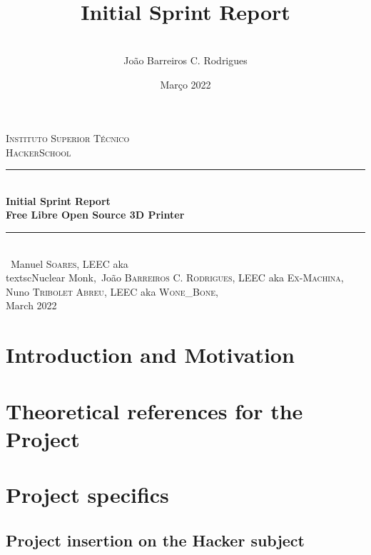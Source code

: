 \documentclass[a4paper,12pt]{article}
\date{Março 2022}
\title{ \\ \large {Initial Sprint Report}}
\author{
\\ João Barreiros C. Rodrigues
\\}
\begin{document}
	\begin{titlepage} %
        \newcommand{\HRule}{\rule{\linewidth}{0.5mm}} %
        \center %
        \textsc{\LARGE Instituto Superior Técnico}\\[1.5cm] %
	\textsc{\Large HackerSchool}\\[0.25cm]
        \HRule\\[0.4cm]
        {\LARGE\bfseries Initial Sprint Report}\\[0.4cm] %
	{\huge\bfseries Free Libre Open Source 3D Printer}\\[0.4cm] %
        \HRule\\[1.5cm]\
	Manuel \textsc{Soares}, LEEC aka \\textsc{Nuclear Monk},\
        João \textsc{Barreiros C. Rodrigues}, LEEC aka \textsc{Ex-Machina},\\
	Nuno \textsc{Tribolet Abreu}, LEEC aka \textsc{Wone_Bone},\\
        \vfill\vfill\vfill %
        {\large March 2022} %
        \vfill %
\end{titlepage}
	\pagenumbering{arabic}
	\newpage
		\tableofcontents
	\section{Introduction and Motivation}
	
	\section{Theoretical references for the Project}
	
	\section{Project specifics}
		
		\subsection{Project insertion on the Hacker subject}
		
\end{document}
